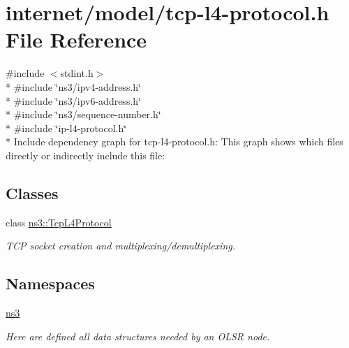 \hypertarget{tcp-l4-protocol_8h}{}\section{internet/model/tcp-\/l4-\/protocol.h File Reference}
\label{tcp-l4-protocol_8h}
{\ttfamily \#include $<$stdint.\+h$>$}\\*
{\ttfamily \#include \char`\"{}ns3/ipv4-\/address.\+h\char`\"{}}\\*
{\ttfamily \#include \char`\"{}ns3/ipv6-\/address.\+h\char`\"{}}\\*
{\ttfamily \#include \char`\"{}ns3/sequence-\/number.\+h\char`\"{}}\\*
{\ttfamily \#include \char`\"{}ip-\/l4-\/protocol.\+h\char`\"{}}\\*
Include dependency graph for tcp-\/l4-\/protocol.h\+:
This graph shows which files directly or indirectly include this file\+:
\subsection*{Classes}
\begin{DoxyCompactItemize}
\item 
class \hyperlink{classns3_1_1TcpL4Protocol}{ns3\+::\+Tcp\+L4\+Protocol}
\begin{DoxyCompactList}\small\item\em T\+CP socket creation and multiplexing/demultiplexing. \end{DoxyCompactList}\end{DoxyCompactItemize}
\subsection*{Namespaces}
\begin{DoxyCompactItemize}
\item 
 \hyperlink{namespacens3}{ns3}
\begin{DoxyCompactList}\small\item\em Here are defined all data structures needed by an O\+L\+SR node. \end{DoxyCompactList}\end{DoxyCompactItemize}
